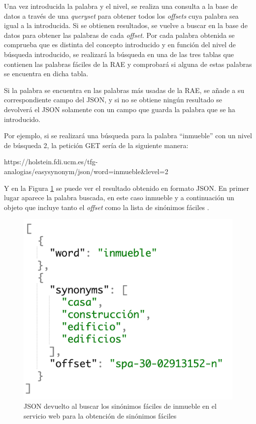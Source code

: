 Una vez introducida la palabra y el nivel, se realiza una consulta a la base de datos a través de una \textit{queryset} para obtener todos los \textit{offsets} cuya palabra sea igual a la introducida.
Si se obtienen resultados, se vuelve a buscar en la base de datos para obtener las palabras de cada \textit{offset}. Por cada palabra obtenida  se comprueba que es distinta del concepto introducido y en función del nivel de búsqueda introducido, se realizará la búsqueda en una de las tres tablas que contienen las palabras fáciles de la RAE y comprobará si alguna de estas palabras se encuentra en dicha tabla.


Si la palabra se encuentra en las palabras más usadas de la RAE, se añade a su correspondiente campo del JSON, y si no se obtiene ningún resultado se devolverá el JSON solamente con un campo que guarda la palabra que se ha introducido.

Por ejemplo, si se realizará una búsqueda para la palabra ``inmueble'' con un nivel de búsqueda 2, la petición GET sería de la siguiente manera:

https://holstein.fdi.ucm.es/tfg-analogias/easysynonym/json/word=inmueble\&level=2

Y en la Figura \ref{fig:peticionGetEasySynonym} se puede ver el resultado obtenido en formato JSON. En primer lugar aparece la palabra buscada, en este caso inmueble y a continuación un objeto que incluye tanto el \textit{offset} como la lista de sinónimos fáciles .

\begin{figure}[!h]
	\includegraphics[width=.6\textwidth]{Imagenes/Bitmap/Capitulo5/peticionGetEasySynonym.png}
	\caption{JSON devuelto al buscar los sinónimos fáciles de inmueble en el servicio web para la obtención de sinónimos fáciles}
	\label{fig:peticionGetEasySynonym}
\end{figure}


